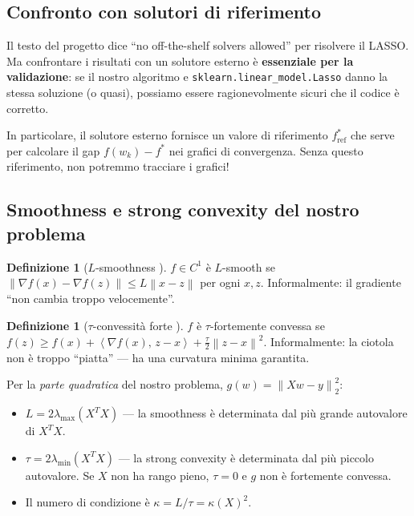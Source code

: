 \documentclass[a4paper,11pt]{article}
\theoremstyle{definition}
\newtheorem{definition}[theorem]{Definizione}
\newcommand{\norm}[1]{\left\lVert #1 \right\rVert}
\newcommand{\inner}[2]{\left\langle #1,\, #2 \right\rangle}
\begin{document}
\subsection{Confronto con solutori di riferimento}

\begin{intuizione}
Il testo del progetto dice ``no off-the-shelf solvers allowed'' per risolvere il LASSO. Ma confrontare i risultati con un solutore esterno è \textbf{essenziale per la validazione}: se il nostro algoritmo e \texttt{sklearn.linear\_model.Lasso} danno la stessa soluzione (o quasi), possiamo essere ragionevolmente sicuri che il codice è corretto.

In particolare, il solutore esterno fornisce un valore di riferimento $f^*_{\text{ref}}$ che serve per calcolare il gap $f(w_k) - f^*$ nei grafici di convergenza. Senza questo riferimento, non potremmo tracciare i grafici!
\end{intuizione}

\subsection{Smoothness e strong convexity del nostro problema}

\begin{definition}[$L$-smoothness {\cite[slide~4, set~4]{opt-slides}}]
$f \in C^1$ è $L$-smooth se $\norm{\nabla f(x) - \nabla f(z)} \leq L\norm{x-z}$ per ogni $x, z$. Informalmente: il gradiente ``non cambia troppo velocemente''.
\end{definition}

\begin{definition}[$\tau$-convessità forte {\cite[slide~4, set~4]{opt-slides}}]
$f$ è $\tau$-fortemente convessa se $f(z) \geq f(x) + \inner{\nabla f(x)}{z-x} + \frac{\tau}{2}\norm{z-x}^2$. Informalmente: la ciotola non è troppo ``piatta'' --- ha una curvatura minima garantita.
\end{definition}

Per la \emph{parte quadratica} del nostro problema, $g(w) = \norm{Xw-y}_2^2$:
\begin{itemize}[nosep]
  \item $L = 2\lambda_{\max}(X^TX)$ --- la smoothness è determinata dal più grande autovalore di $X^TX$.
  \item $\tau = 2\lambda_{\min}(X^TX)$ --- la strong convexity è determinata dal più piccolo autovalore. Se $X$ non ha rango pieno, $\tau = 0$ e $g$ non è fortemente convessa.
  \item Il numero di condizione è $\kappa = L/\tau = \kappa(X)^2$.
\end{itemize}
\end{document}
